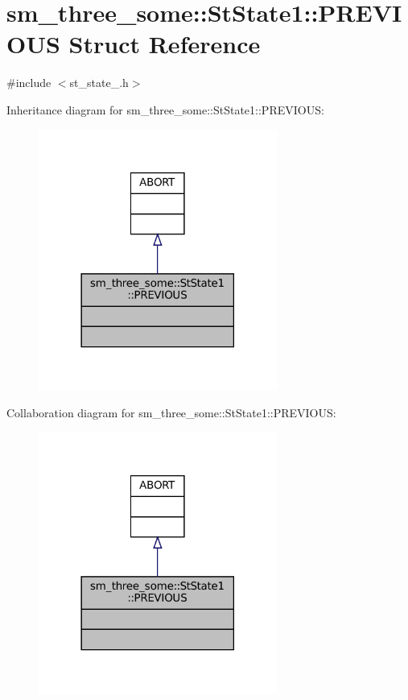 \hypertarget{structsm__three__some_1_1StState1_1_1PREVIOUS}{}\section{sm\+\_\+three\+\_\+some\+:\+:St\+State1\+:\+:P\+R\+E\+V\+I\+O\+US Struct Reference}
\label{structsm__three__some_1_1StState1_1_1PREVIOUS}


{\ttfamily \#include $<$st\+\_\+state\+\_.\+h$>$}



Inheritance diagram for sm\+\_\+three\+\_\+some\+:\+:St\+State1\+:\+:P\+R\+E\+V\+I\+O\+US\+:
\nopagebreak
\begin{figure}[H]
\begin{center}
\leavevmode
\includegraphics[width=222pt]{structsm__three__some_1_1StState1_1_1PREVIOUS__inherit__graph}
\end{center}
\end{figure}


Collaboration diagram for sm\+\_\+three\+\_\+some\+:\+:St\+State1\+:\+:P\+R\+E\+V\+I\+O\+US\+:
\nopagebreak
\begin{figure}[H]
\begin{center}
\leavevmode
\includegraphics[width=222pt]{structsm__three__some_1_1StState1_1_1PREVIOUS__coll__graph}
\end{center}
\end{figure}


